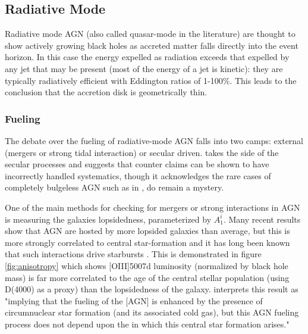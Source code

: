 	\subsection{Radiative Mode}
		\label{subsec:Radiative}
		Radiative mode AGN (also called quasar-mode in the literature) are thought to show actively growing black holes as accreted matter falls directly into the event horizon. In this case the energy expelled as radiation exceeds that expelled by any jet that may be present (most of the energy of a jet is kinetic): they are typically radiatively efficient with Eddington ratios of 1-100\%. This leads to the conclusion that the accretion disk is geometrically thin. 

		\subsubsection{Fueling}
			\label{subsubsec:RadiativeFueling}
			The debate over the fueling of radiative-mode AGN falls into two camps: external (mergers or strong tidal interaction) or secular driven. \citet{Heckman2014} takes the side of the secular processes and suggests that counter claims can be shown to have incorrectly handled systematics, though it acknowledges the rare cases of completely bulgeless AGN such as in \citet{Filippenko1993, Satyapal2009, Simmons2013}, do remain a mystery. 

			One of the main methods for checking for mergers or strong interactions in AGN is measuring the galaxies lopsidedness, parameterized by $A_1^i$. Many recent results show that AGN are hosted by more lopsided galaxies than average, but this is more strongly correlated to central star-formation and it has long been known that such interactions drive starbursts \citep{Larson1978}. This is demonstrated in figure \ref{fig:anisotropy} which shows [OIII]5007d luminosity (normalized by black hole mass) is far more correlated to the age of the central stellar population (using D(4000) as a proxy) than the lopsidedness of the galaxy. \citet{Heckman2014} interprets this result as "implying that the fueling of the [AGN] is enhanced by the presence of circumnuclear star formation (and its associated cold gas), but this AGN fueling process does not depend upon the in which this central star formation arises."

